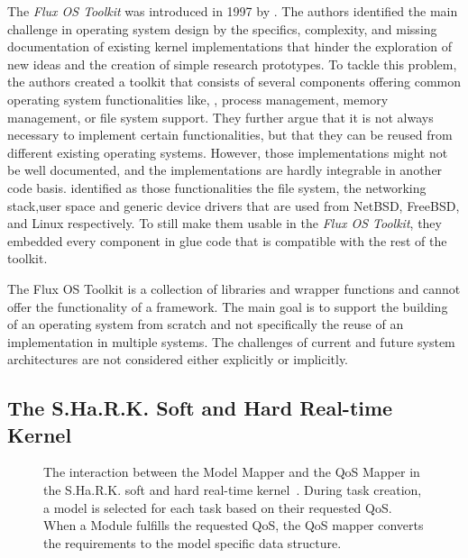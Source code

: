 The \emph{Flux OS Toolkit} was introduced in 1997 by \textcite{Ford-1997-FluxOSKit}. The authors identified the main challenge in operating system design by the specifics, complexity, and missing documentation of existing kernel implementations that hinder the exploration of new ideas and the creation of simple research prototypes. To tackle this problem, the authors created a toolkit that consists of several components offering common operating system functionalities like, \eg, process management, memory management, or file system support. They further argue that it is not always necessary to implement certain functionalities, but that they can be reused from different existing operating systems. However, those implementations might not be well documented, and the implementations are hardly integrable in another code basis. \citeauthor{Ford-1997-FluxOSKit} identified as those functionalities the file system, the networking stack,user space and generic device drivers that are used from NetBSD, FreeBSD, and Linux respectively. To still make them usable in the \emph{Flux OS Toolkit}, they embedded every component in glue code that is compatible with the rest of the toolkit.

The Flux OS Toolkit is a collection of libraries and wrapper functions and cannot offer the functionality of a framework. The main goal is to support the building of an operating system from scratch and not specifically the reuse of an implementation in multiple systems. The challenges of current and future system architectures are not considered either explicitly or implicitly.

\subsection{The S.Ha.R.K. Soft and Hard Real-time Kernel}%
\label{sec:rw:shark}

\begin{figure}[t!]\centering
	\caption[The interaction between the Model Mapper and the QoS Mapper in the S.Ha.R.K. soft and hard real-time kernel.]{The interaction between the Model Mapper and the QoS Mapper in the S.Ha.R.K. soft and hard real-time kernel~\cite[\pno~202(4)]{Gai-2001-SHaRK}. During task creation, a model is selected for each task based on their requested QoS. When a Module fulfills the requested QoS, the QoS mapper converts the requirements to the model specific data structure.}%
	\label{fig:related:shark}
\end{figure}

